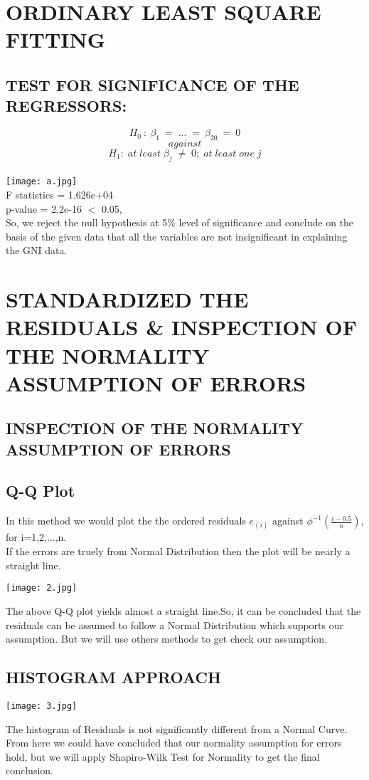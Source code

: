 \documentclass[a4paper,12pt,twoside]{book}
\begin{document}
\section{ORDINARY LEAST SQUARE FITTING}
\subsection{TEST FOR SIGNIFICANCE OF THE REGRESSORS:}
\[H_0\::\:\beta_1\:=\;...\;=\:\beta_{20}\:=\:0\] \[against\]
\[H_1:\;at\;least\;\beta_j\;\neq\;0;\;at\;least\;one\;j\]\\
\texttt{[image: a.jpg]}\\
F statistics = 1.626e+04\\
p-value = 2.2e-16 $<$ 0.05,\\
So, we reject the null hypothesis at 5\% level of
significance and conclude on the basis of the given data that all the variables are not insignificant in explaining the GNI data.
\section{STANDARDIZED THE RESIDUALS \& INSPECTION OF THE NORMALITY ASSUMPTION OF ERRORS}
\subsection*{INSPECTION OF THE NORMALITY ASSUMPTION OF ERRORS}
\subsection{Q-Q Plot}
In this method we would plot the the ordered residuals $e_{(i)}$ against $\phi^{-1}(\frac{i-0.5}{n})$, for i=1,2,...,n.\\If the errors are truely from Normal Distribution then the plot will be nearly a straight line.\\
\begin{center}
\texttt{[image: 2.jpg]}\\
\end{center}
The above Q-Q plot yields almost a straight line.So, it can be concluded that the residuals can be assumed to follow a Normal Distribution which supports our assumption. But we will use others methods to get check our assumption.
\subsection{HISTOGRAM APPROACH}
\begin{center}
\texttt{[image: 3.jpg]}\\
\end{center}
The histogram of Residuals is not significantly different from a Normal Curve. From here we could have concluded that our normality assumption for errors hold, but we will apply Shapiro-Wilk Test for Normality to get the final conclusion.
\newpage
\end{document}
